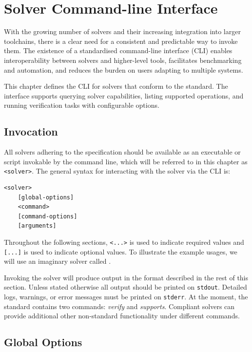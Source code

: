 \chapter{Solver Command-line Interface}
\label{sec:solver_interface}

With the growing number of solvers and their increasing integration into larger toolchains, there is a clear need for a consistent and predictable way to invoke them. The existence of a standardised command-line interface (CLI) enables interoperability between solvers and higher-level tools, facilitates benchmarking and automation, and reduces the burden on users adapting to multiple systems.

This chapter defines the CLI for solvers that conform to the \vnnlib{} standard. The interface supports querying solver capabilities, listing supported operations, and running verification tasks with configurable options.

\section{Invocation}

All solvers adhering to the \vnnlib{} specification should be available as an executable or script invokable by the command line, which will be referred to in this chapter as \texttt{<solver>}. The general syntax for interacting with the solver via the CLI is:
\begin{lstlisting}[style=bash]
<solver>
    [global-options] 
    <command> 
    [command-options] 
    [arguments] 
\end{lstlisting}
Throughout the following sections, \texttt{<...>} is used to indicate required values and \texttt{[...]} is used to indicate optional values. To illustrate the example usages, we will  use an imaginary solver called \texttt{\exampleSolver}.

Invoking the solver will produce output in the format described in the rest of this section. Unless stated otherwise all output should be printed on \texttt{stdout}. Detailed logs, warnings, or error messages must be printed on \texttt{stderr}.
At the moment, the \vnnlib{} standard contains two commands: \emph{verify} and \emph{supports}. Compliant solvers can provide additional other non-standard functionality under different commands. 

\section{Global Options}

